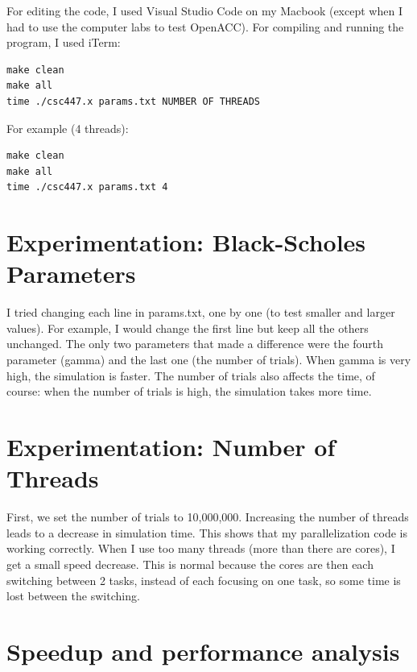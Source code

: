 \documentclass[12pt]{article}
\begin{document}
For editing the code, I used Visual Studio Code on my Macbook (except when I
had to use the computer labs to test OpenACC). For compiling and running the
program, I used iTerm:

\begin{lstlisting}
make clean
make all
time ./csc447.x params.txt NUMBER OF THREADS
\end{lstlisting}

For example (4 threads):

\begin{lstlisting}
make clean
make all
time ./csc447.x params.txt 4
\end{lstlisting}

\section{Experimentation: Black-Scholes Parameters}

I tried changing each line in params.txt, one by one (to test smaller and
larger values). For example, I would change the first line but keep all the
others unchanged. The only two parameters that made a difference were the fourth
parameter (gamma) and the last one (the number of trials). When gamma is very
high, the simulation is faster. The number of trials also affects the time, of
course: when the number of trials is high, the simulation takes more time.

\section{Experimentation: Number of Threads}

First, we set the number of trials to 10,000,000. Increasing the number of
threads leads to a decrease in simulation time. This shows that my
parallelization code is working correctly. When I use too many threads (more
than there are cores), I get a small speed decrease. This is normal because the
cores are then each switching between 2 tasks, instead of each focusing on one
task, so some time is lost between the switching.

\section{Speedup and performance analysis}
\end{document}
